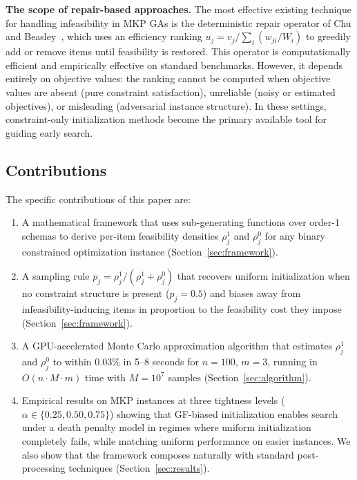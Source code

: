 \documentclass[twocolumn]{article}
\begin{document}
\textbf{The scope of repair-based approaches.}
The most effective existing technique for handling infeasibility in MKP GAs 
is the deterministic repair operator of Chu and 
Beasley~\cite{chu1998genetic}, which uses an efficiency ranking 
$u_j = v_j / \sum_i (w_{ji} / W_i)$ to greedily add or remove items until 
feasibility is restored. This operator is computationally efficient and 
empirically effective on standard benchmarks. However, it depends entirely 
on objective values: the ranking cannot be computed when objective values 
are absent (pure constraint satisfaction), unreliable (noisy or estimated 
objectives), or misleading (adversarial instance structure). In these 
settings, constraint-only initialization methods become the primary 
available tool for guiding early search.

\subsection{Contributions}

The specific contributions of this paper are:

\begin{enumerate}
    \item A mathematical framework that uses sub-generating functions over 
    order-1 schemas to derive per-item feasibility densities 
    $\rho_j^1$ and $\rho_j^0$ for any binary constrained optimization 
    instance (Section~\ref{sec:framework}).

    \item A sampling rule $p_j = \rho_j^1 / (\rho_j^1 + \rho_j^0)$ 
    that recovers uniform initialization when no constraint structure 
    is present ($p_j = 0.5$) and biases away from infeasibility-inducing 
    items in proportion to the feasibility cost they impose 
    (Section~\ref{sec:framework}).

    \item A GPU-accelerated Monte Carlo approximation algorithm that 
    estimates $\rho_j^1$ and $\rho_j^0$ to within $0.03\%$ in 5--8 
    seconds for $n = 100$, $m = 3$, running in $O(n \cdot M \cdot m)$ 
    time with $M = 10^7$ samples (Section~\ref{sec:algorithm}).

    \item Empirical results on MKP instances at three tightness levels 
    ($\alpha \in \{0.25, 0.50, 0.75\}$) showing that GF-biased 
    initialization enables search under a death penalty model in regimes 
    where uniform initialization completely fails, while matching uniform 
    performance on easier instances. We also show that the framework 
    composes naturally with standard post-processing techniques 
    (Section~\ref{sec:results}).
\end{enumerate}
\end{document}
